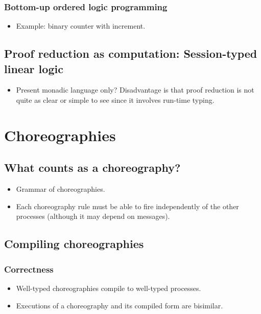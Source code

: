 \documentclass{article}
\begin{document}
\subsubsection{Bottom-up ordered logic programming}\label{sec:ordered-lp}

\begin{itemize}
\item Example: binary counter with increment.
\end{itemize}

\subsection{Proof reduction as computation: Session-typed linear logic}\label{sec:async-sill}

\begin{itemize}
\item Present monadic language only?  Disadvantage is that proof reduction is not quite as clear or simple to see since it involves run-time typing.
\end{itemize}

\section{Choreographies}\label{sec:choreographies}

\subsection{What counts as a choreography?}\label{sec:what-counts-choreo}

\begin{itemize}
\item Grammar of choreographies.
\item Each choreography rule must be able to fire independently of the other processes (although it may depend on messages).
\end{itemize}

\subsection{Compiling choreographies}\label{sec:compile-choreo}

\subsubsection{Correctness}\label{sec:correctness}

\begin{itemize}
\item Well-typed choreographies compile to well-typed processes.
\item Executions of a choreography and its compiled form are bisimilar.
\end{itemize}
\end{document}
